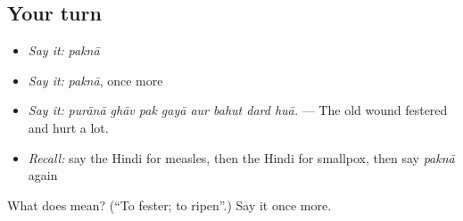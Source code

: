 \subsection*{Your turn}
\begin{itemize}
\raggedright
  \item \emph{Say it:} \emph{paknā}
  \item \emph{Say it:} \emph{paknā}, once more
  \item \emph{Say it:} \emph{purānā ghāv pak gayā aur bahut dard huā.} — The old wound festered and hurt a lot.
  \item \emph{Recall:} say the Hindi for measles, then the Hindi for smallpox, then say \emph{paknā} again
\end{itemize}

\begin{tcolorbox}[breakable,colback=teal!4,colframe=teal!35!black,title={Before you move on}]
What does  mean? (\textquotedblleft{}To fester; to ripen\textquotedblright{}.) Say it once more.
\end{tcolorbox}
